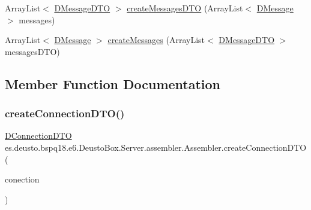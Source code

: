 \begin{DoxyCompactItemize}
\item 
Array\+List$<$ \mbox{\hyperlink{classes_1_1deusto_1_1bspq18_1_1e6_1_1_deusto_box_1_1_server_1_1dto_1_1_d_message_d_t_o}{D\+Message\+D\+TO}} $>$ \mbox{\hyperlink{classes_1_1deusto_1_1bspq18_1_1e6_1_1_deusto_box_1_1_server_1_1assembler_1_1_assembler_ac4bbeb10657d31fc4f12747e21ae7206}{create\+Messages\+D\+TO}} (Array\+List$<$ \mbox{\hyperlink{classes_1_1deusto_1_1bspq18_1_1e6_1_1_deusto_box_1_1_server_1_1jdo_1_1data_1_1_d_message}{D\+Message}} $>$ messages)
\item 
Array\+List$<$ \mbox{\hyperlink{classes_1_1deusto_1_1bspq18_1_1e6_1_1_deusto_box_1_1_server_1_1jdo_1_1data_1_1_d_message}{D\+Message}} $>$ \mbox{\hyperlink{classes_1_1deusto_1_1bspq18_1_1e6_1_1_deusto_box_1_1_server_1_1assembler_1_1_assembler_a193966c5a18bc9a76a8d4b70af24aab1}{create\+Messages}} (Array\+List$<$ \mbox{\hyperlink{classes_1_1deusto_1_1bspq18_1_1e6_1_1_deusto_box_1_1_server_1_1dto_1_1_d_message_d_t_o}{D\+Message\+D\+TO}} $>$ messages\+D\+TO)
\end{DoxyCompactItemize}


\subsection{Member Function Documentation}
\mbox{\label{classes_1_1deusto_1_1bspq18_1_1e6_1_1_deusto_box_1_1_server_1_1assembler_1_1_assembler_a65b3e73a304ba9594f1df93f72193247}} 
\subsubsection{\texorpdfstring{create\+Connection\+D\+T\+O()}{createConnectionDTO()}}
{\footnotesize\ttfamily \mbox{\hyperlink{classes_1_1deusto_1_1bspq18_1_1e6_1_1_deusto_box_1_1_server_1_1dto_1_1_d_connection_d_t_o}{D\+Connection\+D\+TO}} es.\+deusto.\+bspq18.\+e6.\+Deusto\+Box.\+Server.\+assembler.\+Assembler.\+create\+Connection\+D\+TO (\begin{DoxyParamCaption}\item[{\mbox{\hyperlink{classes_1_1deusto_1_1bspq18_1_1e6_1_1_deusto_box_1_1_server_1_1jdo_1_1data_1_1_d_connection}{D\+Connection}}}]{conection }\end{DoxyParamCaption})}

